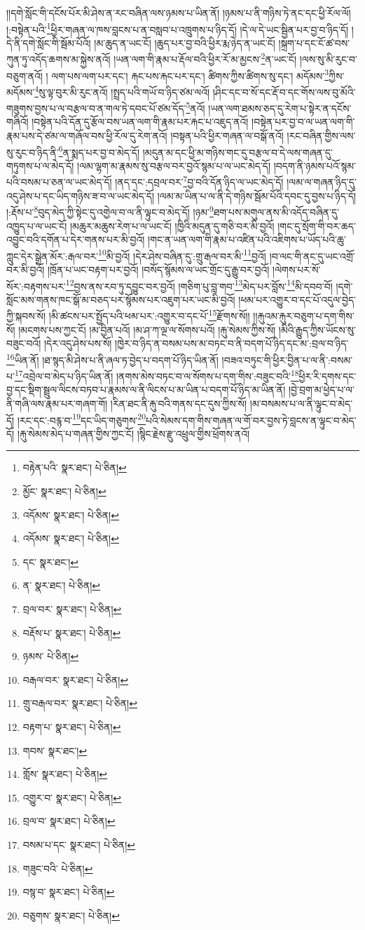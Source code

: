 །།དགེ་སློང་གི་དངོས་པོར་མི་ཤེས་ན་རང་བཞིན་ལས་ཉམས་པ་ཡིན་ནོ། །ཉམས་པ་ནི་གཉིས་ཏེ་ནང་དང་ཕྱི་རོལ་ལོ། །:བསྟེན་པའི་\footnote{བརྟེན་པའི་  སྣར་ཐང་།  པེ་ཅིན། }ཕྱིར་གཞན་ལ་ཁས་བླངས་པ་ན་བསླབ་པ་འཁྲུགས་པ་ཉིད་དོ། །དེ་ལ་དེ་ཡང་སྦྱིན་པར་བྱ་བ་ཉིད་དོ། །དེ་ནི་དགེ་སློང་གི་སྦོམ་པོའོ། །མ་ཆུད་ན་ཡང་ངོ། །ཆུད་པར་བྱ་བའི་ཕྱིར་རྨ་ཉེད་ན་ཡང་ངོ། །སྐྲག་པ་དང་ངོ་ཚ་བས་ཀུན་ཏུ་འདོད་ཆགས་མ་སྐྱེས་ནའོ། །ཡན་ལག་གི་རྣམ་པ་རྡོལ་བའི་ཕྱིར་རོ་མ་མྱངས་\footnote{མྱོང་  སྣར་ཐང་།  པེ་ཅིན། }ན་ཡང་ངོ། །ལས་སུ་མི་རུང་བ་བཅུག་ནའོ། །
ལག་པས་ལག་པར་དང་། རྐང་པས་རྐང་པར་དང་། ཚིགས་ཀྱིས་ཚིགས་སུ་དང་། མདོམས་\footnote{འདོམས་  སྣར་ཐང་།  པེ་ཅིན། }ཀྱིས་མདོམས་\footnote{འདོམས་  སྣར་ཐང་།  པེ་ཅིན། }སུ་ལྟ་བུར་མི་རུང་ནའོ། །སྤྲད་པའི་གཡོ་བ་ཉིད་ཙམ་ལའོ། །ཤིང་དང་བ་སོ་དང་རྡོ་བ་དང་གོས་ལས་བུ་མོའི་གཟུགས་བྱས་པ་ལ་བརྩལ་བ་ན་གལ་ཏེ་དབང་པོ་ཙམ་དོད་\footnote{དང་  སྣར་ཐང་། }ནའོ། །ཡན་ལག་ཐམས་ཅད་དུ་རེག་པ་སྟེར་ན་དངོས་གཞིའོ། །བསྟེན་པའི་དོན་དུ་རྩོལ་བས་ཡན་ལག་གི་རྣམ་པར་རྐང་པ་འཇུད་ནའོ། །བསྟེན་པར་བྱ་བ་ལ་ཡན་ལག་གི་རྣམ་པས་དེ་ཙམ་ལ་གཞོལ་བས་ཕྱི་རོལ་དུ་རེག་ནའོ། །བསྟན་པའི་ཕྱིར་གཞན་ལ་བསྒོ་ནའོ། །རང་བཞིན་གྱིས་ལས་སུ་རུང་བ་ཉིད་ནི་\footnote{ན་  སྣར་ཐང་།  པེ་ཅིན། }ན་སྨད་པར་བྱ་བ་མེད་དོ། །མདུན་མ་དང་ཕྱི་མ་གཉིས་གང་དུ་བརྩལ་བ་དེ་ལས་གཞན་དུ་གཏུགས་པ་ལ་མེད་དོ། །ལམ་ལྷག་མ་རྣམས་སུ་བརྩལ་བར་བྱའོ་སྙམ་པ་ལ་ཡང་མེད་དོ། །བདག་ནི་ཉམས་པའོ་སྙམ་པའི་བསམ་པ་ཅན་ལ་ཡང་མེད་དོ། །ནད་དང་:དབྲལ་བར་\footnote{བྲལ་བར་  སྣར་ཐང་།  པེ་ཅིན། }བྱ་བའི་དོན་ཉིད་ལ་ཡང་མེད་དོ། །ལམ་ལ་གཞན་ཉིད་དུ་འདུ་ཤེས་པ་དང་ཡིད་གཉིས་ཟ་བ་ལ་ཡང་མེད་དོ། །ལམ་མ་ཡིན་པ་ལ་ནི་དེ་གཉིས་སྦོམ་པོའི་དབང་དུ་བྱས་པ་ཉིད་དོ། །:རྡོས་པ་\footnote{བརྡོས་པ་  སྣར་ཐང་།  པེ་ཅིན། }བུད་མེད་ཀྱི་སྟེང་དུ་འགྱེལ་བ་ལ་ནི་ལྟུང་བ་མེད་དོ། །ཉམ་\footnote{ཉམས་  པེ་ཅིན། }ཐག་པས་མགུལ་ནས་མི་འདོད་བཞིན་དུ་འཁྱུད་པ་ལ་ཡང་ངོ། །མཆུར་མཆུས་རེག་པ་ལ་ཡང་ངོ། །ཁྱིའི་མདུན་དུ་གཅི་བར་མི་བྱའོ། །གང་དུ་སྲོག་གི་བར་ཆད་འབྱུང་བའི་དགོན་པ་དེར་གནས་པར་མི་བྱའོ། །གང་ན་ཡན་ལག་གི་རྣམ་པ་འཛིན་པའི་འཇིགས་པ་ཡོད་པའི་ཆུ་ཀླུང་དེར་སྒྲེན་མོར་:རྒལ་བར་\footnote{བརྒལ་བར་  སྣར་ཐང་།  པེ་ཅིན། }མི་བྱའོ། །དེར་ཤེས་བཞིན་དུ་:གྲུ་རྒལ་བར་མི་\footnote{གྲུ་བརྒལ་བར་  སྣར་ཐང་།  པེ་ཅིན། }བྱའོ། །བ་ལང་གི་ནང་དུ་ཡང་འགྲོ་བར་མི་བྱའོ། །ཁྲོན་པ་ཡང་བརྟག་པར་བྱའོ། །བསོད་སྙོམས་ལ་ཡང་གྲོང་དུ་རྒྱུ་བར་བྱའོ། །ལེགས་པར་སོ་སོར་:བརྟགས་པར་\footnote{བརྟག་པ་  སྣར་ཐང་།  པེ་ཅིན། }བྱས་ནས་རབ་ཏུ་དབྱུང་བར་བྱའོ། །གཅིག་པུ་བླ་གབ་\footnote{གབས་  སྣར་ཐང་། }མེད་པར་བློས་\footnote{གློས་  སྣར་ཐང་།  པེ་ཅིན། }མི་དབབ་བོ། །དགེ་སློང་མས་གནས་ཁང་སྒོ་མ་བཅད་པར་སྙོམས་པར་འཇུག་པར་ཡང་མི་བྱའོ། །ཕམ་པར་འགྱུར་བ་དང་པོ་འདུལ་བྱེད་ཀྱི་སྐབས་སོ། །མི་ཚངས་པར་སྤྱོད་པའི་ཕམ་པར་:འགྱུར་བ་དང་པོ་\footnote{འགྱུར་བ་  སྣར་ཐང་།  པེ་ཅིན། }རྫོགས་སོ།། །།རྐུའམ་རྐུར་བཅུག་པ་དག་གིས་སོ། །མངགས་པས་ཀྱང་ངོ། །མ་བྱིན་པའོ། །མ་ཤ་ཀ་ལྔ་ལ་སོགས་པའོ། །རྐུ་སེམས་ཀྱིས་སོ། །མིའི་རྒྱུད་ཀྱིས་ཡོངས་སུ་བཟུང་བའོ། །དེར་འདུ་ཤེས་པས་སོ། །ཁྱེར་བ་ཉིད་ན་བསམ་པས་མ་བཏང་བ་ནི་བདག་པོ་ཉིད་དང་མ་:བྲལ་བ་ཉིད་\footnote{བྲལ་བ་  སྣར་ཐང་།  པེ་ཅིན། }ཡིན་ནོ། །ཐ་སྙད་མི་ཤེས་པ་ནི་ཞལ་ཏ་བྱེད་པ་བདག་པོ་ཉིད་ཡིན་ནོ། །བཟའ་བཏུང་གི་ཕྱིར་བྱིན་པ་ལ་ནི་:བསམ་པ་\footnote{བསམ་པ་དང་  སྣར་ཐང་།  པེ་ཅིན། }འབྲེལ་བ་མེད་པ་ཉིད་ཡིན་ནོ། །ནགས་མེས་བཏང་བ་ལ་སོགས་པ་དག་གིས་:བཟུང་བའི་\footnote{གཟུང་བའི་  པེ་ཅིན། }ཕྱིར་རི་དགས་དང་བྱ་དང་སྡིག་སྦྲུལ་ལིངས་བཏབ་པ་རྣམས་ལ་ནི་ལིངས་པ་མ་ཡིན་པ་བདག་པོ་ཉིད་མ་ཡིན་ནོ། །བྱེ་བྲག་མ་ཕྱེད་པ་ལ་ནི་གཞི་ལས་རྣམ་པར་གཞག་གོ། །རིན་ཐང་ནི་རྐུ་བའི་གནས་དང་དུས་ཀྱིས་སོ། །མ་བསམས་པ་ལ་ནི་ལྟུང་བ་མེད་དོ། །རང་དང་:བརྙ་བ་\footnote{བསྙ་བ་  སྣར་ཐང་།  པེ་ཅིན། }དང་ཡིད་གཅུགས་\footnote{བཅུགས་  སྣར་ཐང་།  པེ་ཅིན། }པའི་སེམས་དག་གིས་གཞན་ལ་གོ་བར་བྱས་ཏེ་བླངས་ན་ལྟུང་བ་མེད་དོ། །རྐུ་སེམས་མེད་པ་གཞན་གྱིས་ཀྱང་ངོ། །སྙིང་རྗེས་རྫུ་འཕྲུལ་གྱིས་ཕྲོགས་ནའོ། 